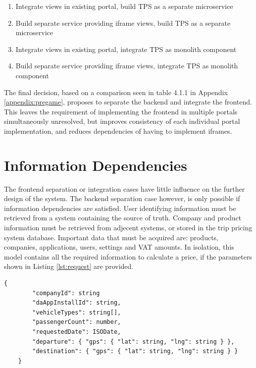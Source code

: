 \begin{enumerate}
	\item Integrate views in existing portal, build TPS as a separate microservice
	\item Build separate service providing iframe views, build TPS as a separate microservice
	\item Integrate views in existing portal, integrate TPS as monolith component
	\item Build separate service providing iframe views, integrate TPS as monolith component
\end{enumerate}

The final decision, based on a comparison seen in table 4.1.1 in Appendix \ref{appendix:pregame}, proposes to separate the backend and integrate the frontend. This leaves the requirement of implementing the frontend in multiple portals simultaneously unresolved, but improves consistency of each individual portal implementation, and reduces dependencies of having to implement iframes.

%
\section{Information Dependencies}
The frontend separation or integration cases have little influence on the further design of the system. The backend separation case however, is only possible if information dependencies are satisfied. User identifying information must be retrieved from a system containing the source of truth. Company and product information must be retrieved from adjecent systems, or stored in the trip pricing system database. Important data that must be acquired are: products, companies, applications, users, settings and VAT amounts. In isolation, this model contains all the required information to calculate a price, if the parameters shown in Listing \ref{lst:request} are provided.

\begin{center}
\noindent\begin{minipage}{.85\textwidth}
\begin{lstlisting}[caption={Minimal external information required for a trip price calculation.}, label={lst:request}]
	{
		"companyId": string
		"daAppInstallId": string,
		"vehicleTypes": string[],
		"passengerCount": number,
		"requestedDate": ISODate,
		"departure": { "gps": { "lat": string, "lng": string } },
		"destination": { "gps": { "lat": string, "lng": string } }
	}
\end{lstlisting}
\end{minipage}
\end{center}

